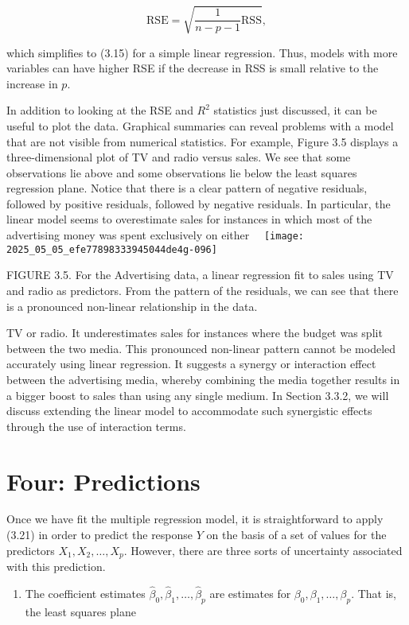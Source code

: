\documentclass[10pt]{article}
\begin{document}
\begin{equation*}
\mathrm{RSE}=\sqrt{\frac{1}{n-p-1} \mathrm{RSS}}, \tag{3.25}
\end{equation*}


which simplifies to (3.15) for a simple linear regression. Thus, models with more variables can have higher RSE if the decrease in RSS is small relative to the increase in $p$.

In addition to looking at the RSE and $R^{2}$ statistics just discussed, it can be useful to plot the data. Graphical summaries can reveal problems with a model that are not visible from numerical statistics. For example, Figure 3.5 displays a three-dimensional plot of TV and radio versus sales. We see that some observations lie above and some observations lie below the least squares regression plane. Notice that there is a clear pattern of negative residuals, followed by positive residuals, followed by negative residuals. In particular, the linear model seems to overestimate sales for instances in which most of the advertising money was spent exclusively on either\
\
\texttt{[image: 2025\_05\_05\_efe77898333945044de4g-096]}

FIGURE 3.5. For the Advertising data, a linear regression fit to sales using TV and radio as predictors. From the pattern of the residuals, we can see that there is a pronounced non-linear relationship in the data.

TV or radio. It underestimates sales for instances where the budget was split between the two media. This pronounced non-linear pattern cannot be modeled accurately using linear regression. It suggests a synergy or interaction effect between the advertising media, whereby combining the media together results in a bigger boost to sales than using any single medium. In Section 3.3.2, we will discuss extending the linear model to accommodate such synergistic effects through the use of interaction terms.

\section*{Four: Predictions}
Once we have fit the multiple regression model, it is straightforward to apply (3.21) in order to predict the response $Y$ on the basis of a set of values for the predictors $X_{1}, X_{2}, \ldots, X_{p}$. However, there are three sorts of uncertainty associated with this prediction.

\begin{enumerate}
  \item The coefficient estimates $\hat{\beta}_{0}, \hat{\beta}_{1}, \ldots, \hat{\beta}_{p}$ are estimates for $\beta_{0}, \beta_{1}, \ldots, \beta_{p}$. That is, the least squares plane
\end{enumerate}
\end{document}
